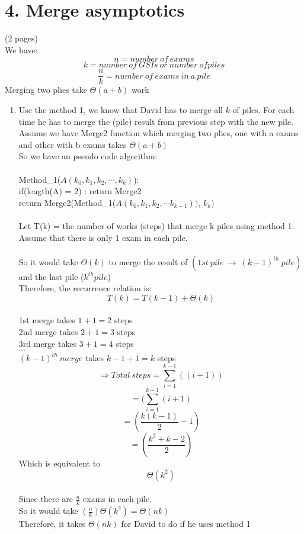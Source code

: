\documentclass[11pt]{article}
\newenvironment{qparts}{\begin{enumerate}[{(}a{)}]}{\end{enumerate}}
\newcommand{\tab}{\hspace*{2em}}
\begin{document}
\section*{4. Merge asymptotics} (2 pages)\\
\Large{}
We have: 
$$n = number\ of\ exams$$
$$k = number\ of\ GSIs\ or\ number\ of piles$$
$$\frac{n}{k} = number\ of\ exams\ in\ a\ pile$$
Merging two plies take $\Theta(a + b)$ work
\begin{qparts}

\item %
Use the method 1, we know that David has to merge all $k$ of piles. For each time he has to merge the (pile) result from previous step with the new pile. Assume we have Merge2 function which merging two plies, one with a exams and other with b exams takes $\Theta(a + b)$
\\
So we have an pseudo code algorithm:\\
\\
Method\_1($A(k_0, k_1, k_2, \cdots, k_k)$):\\
\tab if(length(A) = 2) : return Merge2 \\
\tab return Merge2(Method\_1($A(k_0, k_1, k_2, \cdots k_{k-1}))$, $k_k$)\\ 
\\


Let T(k) = the number of works (steps) that merge k piles using method 1.
\\
Assume that there is only 1 exam in each pile.\\
\\
So it would take $\Theta(k)$ to merge the result of $(1st\ pile\ \to \ (k-1)^{th}\ pile)$ and the last pile ($k^{th} pile$)
\\
Therefore, the recurrence relation is:
$$T(k) = T(k-1) + \Theta(k)$$
\\
1st merge takes $1 + 1 = 2$ steps\\
2nd merge takes $2 + 1 = 3$ steps\\ 
3rd merge takes $3 + 1 = 4$ steps\\
$\cdots$\\
$(k-1)^{th}\ merge$ takes $k-1 + 1 = k$ steps
\\
$$\Longrightarrow Total\ steps = \sum\limits_{i=1}^{k-1} ((i + 1))$$
$$=  (\sum\limits_{i=1}^{k-1} (i  + 1)$$
$$= (\frac{k(k-1)}{2} - 1 )$$
$$= (\frac{k^2 + k - 2}{2})$$
Which is equivalent to $$\Theta{(k^2)}$$\\
Since there are $\frac{n}{k}$ exams in each pile.\\
So it would take $(\frac{n}{k}) \Theta(k^2) = \Theta(nk)$
\\
Therefore, it takes $\boxed{\Theta(nk)}$ for David to do if he uses method 1


\end{qparts}
\end{document}
